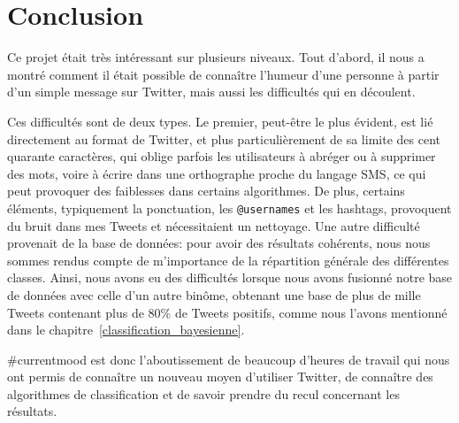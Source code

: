\documentclass[12pt,a4paper]{report}
\newcommand{\CMName}{\#currentmood}
\begin{document}

\chapter{Conclusion}
Ce projet était très intéressant sur plusieurs niveaux. Tout d'abord, il nous a
montré comment il était possible de connaître l'humeur d'une personne à partir
d'un simple message sur Twitter, mais aussi les difficultés qui en découlent.

Ces difficultés sont de deux types. Le premier, peut-être le plus évident, est
lié directement au format de Twitter, et plus particulièrement de sa limite des
cent quarante caractères, qui oblige parfois les utilisateurs à abréger ou à
supprimer des mots, voire à écrire dans une orthographe proche du langage SMS,
ce qui peut provoquer des faiblesses dans certains algorithmes. De plus,
certains éléments, typiquement la ponctuation, les \texttt{@usernames} et les
hashtags, provoquent du bruit dans mes Tweets et nécessitaient un nettoyage.
Une autre difficulté provenait de la base de données: pour avoir des résultats
cohérents, nous nous sommes rendus compte de m'importance de la répartition
générale des différentes classes. Ainsi, nous avons eu des difficultés lorsque
nous avons fusionné notre base de données avec celle d'un autre binôme, obtenant
une base de plus de mille Tweets contenant plus de 80\% de Tweets positifs,
comme nous l'avons mentionné dans le chapitre~\ref{classification_bayesienne}.

\CMName{} est donc l'aboutissement de beaucoup d'heures de travail qui nous ont
permis de connaître un nouveau moyen d'utiliser Twitter, de connaître des
algorithmes de classification et de savoir prendre du recul concernant les
résultats.
\end{document}
